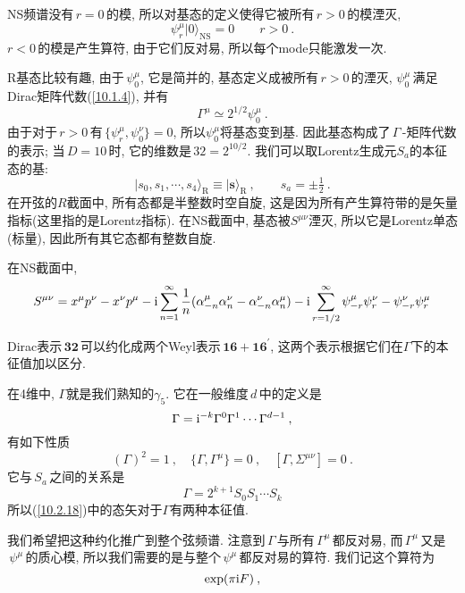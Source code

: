 NS频谱没有$\,r=0\,$的模, 所以对基态的定义使得它被所有$\,r>0\,$的模湮灭,
\begin{equation}
    \psi_{r}^{\mu}\lvert 0\rangle_{\text{NS}} =0 \qquad r>0 \:. \label{10.2.16}
\end{equation}
$r<0\,$的模是产生算符, 由于它们反对易, 所以每个mode只能激发一次.

R基态比较有趣, 由于$\,\psi_{0}^{\mu}$, 它是简并的, 基态定义成被所有$\,r>0\,$的湮灭, $\psi_{0}^{\mu}\,$满足Dirac矩阵代数(\ref{10.1.4}), 并有
\begin{equation}
    \Gamma^{\mu}\simeq 2^{1/2}\psi_{0}^{\mu} \:.\label{10.2.17}
\end{equation}
由于对于$\,r>0\,$有$\,\{\psi_{r}^{\mu},\psi_{0}^{\nu}\}=0$, 所以$\psi_{0}^{\mu}$将基态变到基. 因此基态构成了$\,\Gamma\,$-矩阵代数的表示; 当$\,D=10\,$时, 它的维数是$\,32=2^{10/2}$. 我们可以取Lorentz生成元$S_{a}$的本征态的基:
\begin{equation}
    \lvert s_{0},s_{1},\cdots ,s_{4}\rangle_{\text{R}}\equiv \lvert\mathbf{s}\rangle_{\text{R}}\:, 
     \qquad s_{a}=\pm\tfrac{1}{2} \:. \label{10.2.18}
\end{equation}
在开弦的$R$截面中, 所有态都是半整数时空自旋, 这是因为所有产生算符带的是矢量指标(这里指的是Lorentz指标). 在NS截面中, 基态被$S^{\mu\nu}$湮灭, 所以它是Lorentz单态(标量), 因此所有其它态都有整数自旋.
\begin{tcolorbox}
在NS截面中, 
\[
S^{\mu\nu}=x^{\mu}p^{\nu}-x^{\nu}p^{\mu} -\mathrm{i} \sum_{n=1}^{\infty}\frac{1}{n}(\alpha_{-n}^{\mu}\alpha_{n}^{\nu}-\alpha^{\nu}_{-n}\alpha_{n}^{\mu})
-\mathrm{i}\sum_{r=1/2}^{\infty}\psi_{-r}^{\mu}\psi_{r}^{\nu}- \psi_{-r}^{\nu}\psi_{r}^{\mu}
\]
\end{tcolorbox}
Dirac表示$\,\mathbf{32}\,$可以约化成两个Weyl表示$\,\mathbf{16}+\mathbf{16}^{\prime}$, 这两个表示根据它们在$\Gamma$下的本征值加以区分.
\begin{tcolorbox}
在4维中, $\Gamma$就是我们熟知的$\gamma_{5}$. 它在一般维度$\,d\,$中的定义是
\[
\Gamma=\mathrm{i}^{-k}\Gamma^{0}\Gamma^{1}\cdots\Gamma^{d-1}\:, 
\]
有如下性质
\[
(\Gamma)^{2}=1 \:, \quad \{\Gamma,\Gamma^{\mu}\}=0\:,\quad [\Gamma,\Sigma^{\mu\nu}]=0 \:.
\]
它与$\,S_{a}\,$之间的关系是
\[
\Gamma= 2^{k+1}S_{0}S_{1}\cdots S_{k}
\]
所以(\ref{10.2.18})中的态矢对于$\Gamma$有两种本征值.
\end{tcolorbox}
我们希望把这种约化推广到整个弦频谱. 注意到$\,\Gamma\,$与所有$\,\Gamma^{\mu}\,$都反对易, 而$\,\Gamma^{\mu}\,$又是$\,\psi^{\mu}\,$的质心模, 所以我们需要的是与整个$\,\psi^{\mu}\,$都反对易的算符. 我们记这个算符为
\begin{equation}
    \exp(\pi\mathrm{i} F) \:, \label{10.2.19}
\end{equation}
